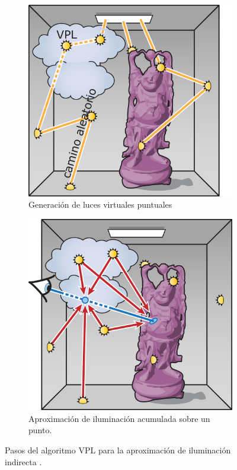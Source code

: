 \begin{figure}[H]
	\centering
	\begin{subfigure}[h]{0.35\textwidth}
		\centering
		\captionsetup{justification=centering}
		\includegraphics[width=\linewidth]{media/vpl1.png}
		\caption*{Generación de luces virtuales puntuales}
	\end{subfigure}
	\hspace{0.1\textwidth}
	\begin{subfigure}[h]{0.35\textwidth}
		\centering
		\captionsetup{justification=centering}
		\includegraphics[width=\linewidth]{media/vpl2.png}
		\caption*{Aproximación de iluminación acumulada sobre un punto.}
	\end{subfigure}
	\caption{Pasos del algoritmo \ac{VPL} para la aproximación de iluminación indirecta \cite{Dachsbacher2014ManyLights}.}
	\label{fig:vpl_passes}
\end{figure}


